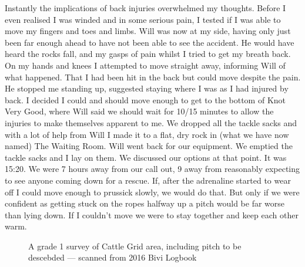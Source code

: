     Instantly the implications of back injuries overwhelmed my thoughts. Before I even realised I was winded and in some serious pain, I tested if I was able to move my fingers and toes and limbs. Will was now at my side, having only just been far enough ahead to have not been able to see the accident. He would have heard the rocks fall, and my gasps of pain whilst I tried to get my breath back. On my hands and knees I attempted to move straight away, informing Will of what happened. That I had been hit in the back but could move despite the pain. He stopped me standing up, suggested staying where I was as I had injured by back. I decided I could and should move enough to get to the bottom of Knot Very Good, where Will said we should wait for 10/15 minutes to allow the injuries to make themselves apparent to me. We dropped all the tackle sacks and with a lot of help from Will I made it to a flat, dry rock in (what we have now named) The Waiting Room. Will went back for our equipment. We emptied the tackle sacks and I lay on them. We discussed our options at that point. It was 15:20. We were 7 hours away from our call out, 9 away from reasonably expecting to see anyone coming down for a rescue. If, after the adrenaline started to wear off I could move enough to prussick slowly, we would do that. But only if we were confident as getting stuck on the ropes halfway up a pitch would be far worse than lying down. If I couldn’t move we were to stay together and keep each other warm.

    \begin{figure}[t]
        \checkoddpage \ifoddpage \forcerectofloat \else \forceversofloat \fi
        \centering
        \caption{A grade 1 survey of Cattle Grid area, including pitch to be descebded --- scanned from 2016 Bivi Logbook}
        \label{Cattlegrid}
    \end{figure}

